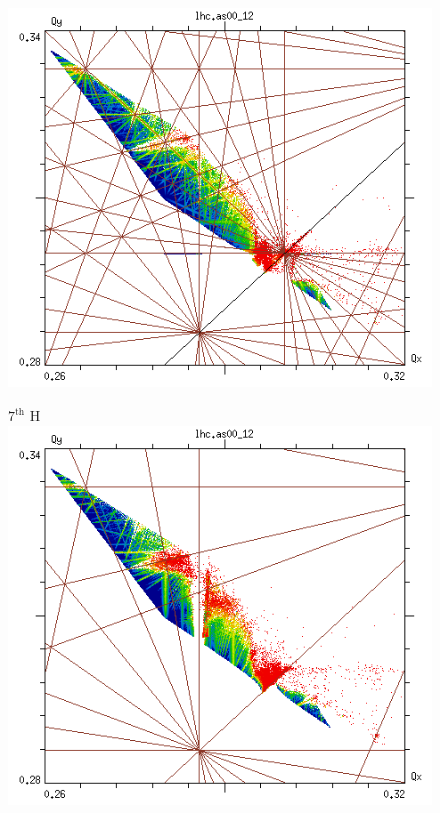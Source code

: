 \documentclass[%
 reprint,
 amsmath,amssymb,
 aps,
prstab,
]{revtex4-1}
\begin{document}
\begin{figure}[h]
\begin{minipage}[t]{0.49\linewidth}
		\includegraphics[width=1.0\linewidth]{2016injnocolc15o+19_6noerrut10skhv_dp0_ord10.png}
	\end{minipage}	
	\begin{minipage}[t]{0.49\linewidth}
		\centering
		$7^{\mathrm{th}}$ H
		\includegraphics[width=1.0\linewidth]{2016injnocolc15o+19_6noerrut7skh_dp0_ord7.png}
	\end{minipage}	
	\begin{minipage}[t]{0.49\linewidth}

\end{minipage}
\end{figure}
\end{document}
